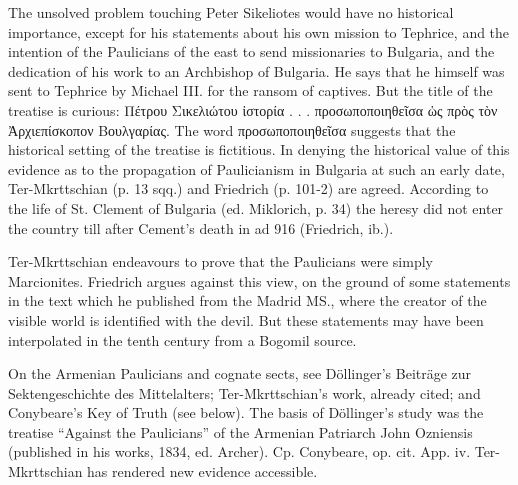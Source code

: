 The unsolved problem touching Peter Sikeliotes would have no historical importance, except for his statements about his own mission to Tephrice, and the intention of the Paulicians of the east to send missionaries to Bulgaria, and the dedication of his work to an Archbishop of Bulgaria. He says that he himself was sent to Tephrice by Michael III. for the ransom of captives. But the title of the treatise is curious: \textgreek{Πέτρου Σικελιώτου \texthebrew{ἱ}στορία . . . προσωποποιηθε\texthebrew{ῖ}σα \texthebrew{ὡ}ς πρ\texthebrew{ὸ}ς τ\texthebrew{ὸ}ν \texthebrew{Ἀ}ρχιεπίσκοπον Βουλγαρίας}. The word \textgreek{προσωποποιηθε\texthebrew{ῖ}σα} suggests that the historical setting of the treatise is fictitious. In denying the historical value of this evidence as to the propagation of Paulicianism in Bulgaria at such an early date, Ter-Mkrttschian (p. 13 sqq.) and Friedrich (p. 101-2) are agreed. According to the life of St. Clement of Bulgaria (ed. Miklorich, p. 34) the heresy did not enter the country till after Cement\texthebrew{}’s death in ad 916 (Friedrich, ib.).

Ter-Mkrttschian endeavours to prove that the Paulicians were simply Marcionites. Friedrich argues against this view, on the ground of some statements in the text which he published from the Madrid MS., where the creator of the visible world is identified with the devil. But these statements may have been interpolated in the tenth century from a Bogomil source.

On the Armenian Paulicians and cognate sects, see Döllinger\texthebrew{}’s Beiträge zur Sektengeschichte des Mittelalters; Ter-Mkrttschian\texthebrew{}’s work, already cited; and Conybeare\texthebrew{}’s Key of Truth (see below). The basis of Döllinger\texthebrew{}’s study was the treatise \texthebrew{“}Against the Paulicians\texthebrew{}” of the Armenian Patriarch John Ozniensis (published in his works, 1834, ed. Archer). Cp. Conybeare, op. cit. App. iv. Ter-Mkrttschian has rendered new evidence accessible.

